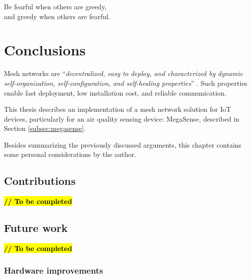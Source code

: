 
\begin{savequote}[70mm]
	Be fearful when others are greedy,\\
	and greedy when others are fearful.
\end{savequote}

\chapter{Conclusions}\label{chapter:conclusions}

	Mesh networks are ``\textit{decentralized, easy to deploy, and characterized by dynamic self-organization, self-configuration, and self-healing properties}'' \cite{Sampaio-2015}.
	Such properties enable fast deployment, low installation cost, and reliable communication.
	
	This thesis describes an implementation of a mesh network solution for IoT devices, particularly for an air quality sensing device: MegaSense, described in Section \ref{subsec:megasense}.
	
%	
	
	Besides summarizing the previously discussed arguments, this chapter contains some personal considerations by the author.

	\section{Contributions}
	
		\textbf{\textcolor{red}{\hl{// To be completed}}}

	\section{Future work}
		
		\textbf{\textcolor{red}{\hl{// To be completed}}}
	
		\subsection{Hardware improvements}
			
		
